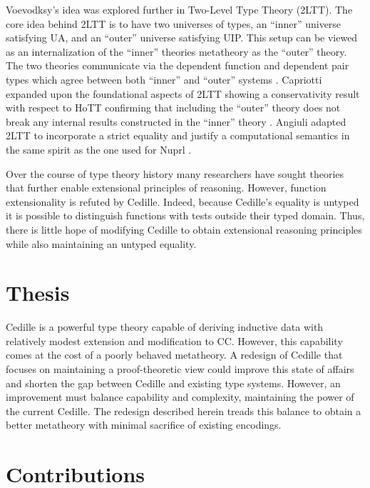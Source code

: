 Voevodksy's idea was explored further in Two-Level Type Theory (2LTT).
The core idea behind 2LTT is to have two universes of types, an ``inner'' universe satisfying UA, and an ``outer'' universe satisfying UIP.
This setup can be viewed as an internalization of the ``inner'' theories metatheory as the ``outer'' theory.
The two theories communicate via the dependent function and dependent pair types which agree between both ``inner'' and ``outer'' systems \cite{annenkov2023}.
Capriotti expanded upon the foundational aspects of 2LTT showing a conservativity result with respect to HoTT confirming that including the ``outer'' theory does not break any internal results constructed in the ``inner'' theory \cite{capriotti2017}.
Angiuli adapted 2LTT to incorporate a strict equality and justify a computational semantics in the same spirit as the one used for Nuprl \cite{angiuli2019}.

Over the course of type theory history many researchers have sought theories that further enable extensional principles of reasoning.
However, function extensionality is refuted by Cedille.
Indeed, because Cedille's equality is untyped it is possible to distinguish functions with tests outside their typed domain.
Thus, there is little hope of modifying Cedille to obtain extensional reasoning principles while also maintaining an untyped equality.

\section{Thesis}

Cedille is a powerful type theory capable of deriving inductive data with relatively modest extension and modification to CC.
However, this capability comes at the cost of a poorly behaved metatheory.
A redesign of Cedille that focuses on maintaining a proof-theoretic view could improve this state of affairs and shorten the gap between Cedille and existing type systems.
However, an improvement must balance capability and complexity, maintaining the power of the current Cedille.
The redesign described herein treads this balance to obtain a better metatheory with minimal sacrifice of existing encodings.

\section{Contributions}

